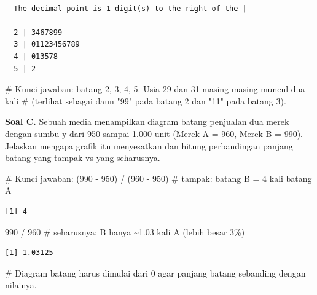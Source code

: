 \documentclass[
  indonesian,
  letterpaper,
]{book}
\newenvironment{Shaded}{\begin{snugshade}}{\end{snugshade}}
\newcommand{\CommentTok}[1]{\textcolor[rgb]{0.37,0.37,0.37}{#1}}
\newcommand{\DecValTok}[1]{\textcolor[rgb]{0.68,0.00,0.00}{#1}}
\newcommand{\NormalTok}[1]{\textcolor[rgb]{0.00,0.23,0.31}{#1}}
\newcommand{\SpecialCharTok}[1]{\textcolor[rgb]{0.37,0.37,0.37}{#1}}
\begin{document}
\begin{verbatim}

  The decimal point is 1 digit(s) to the right of the |

  2 | 3467899
  3 | 01123456789
  4 | 013578
  5 | 2
\end{verbatim}

\begin{Shaded}
\begin{Highlighting}[]
\CommentTok{\# Kunci jawaban: batang 2, 3, 4, 5. Usia 29 dan 31 masing{-}masing muncul dua kali}
\CommentTok{\# (terlihat sebagai daun "99" pada batang 2 dan "11" pada batang 3).}
\end{Highlighting}
\end{Shaded}

\textbf{Soal C.} Sebuah media menampilkan diagram batang penjualan dua
merek dengan sumbu-y dari 950 sampai 1.000 unit (Merek A = 960, Merek B
= 990). Jelaskan mengapa grafik itu menyesatkan dan hitung perbandingan
panjang batang yang tampak vs yang seharusnya.

\begin{Shaded}
\begin{Highlighting}[]
\CommentTok{\# Kunci jawaban:}
\NormalTok{(}\DecValTok{990} \SpecialCharTok{{-}} \DecValTok{950}\NormalTok{) }\SpecialCharTok{/}\NormalTok{ (}\DecValTok{960} \SpecialCharTok{{-}} \DecValTok{950}\NormalTok{) }\CommentTok{\# tampak: batang B = 4 kali batang A}
\end{Highlighting}
\end{Shaded}

\begin{verbatim}
[1] 4
\end{verbatim}

\begin{Shaded}
\begin{Highlighting}[]
\DecValTok{990} \SpecialCharTok{/} \DecValTok{960} \CommentTok{\# seharusnya: B hanya \textasciitilde{}1.03 kali A (lebih besar 3\%)}
\end{Highlighting}
\end{Shaded}

\begin{verbatim}
[1] 1.03125
\end{verbatim}

\begin{Shaded}
\begin{Highlighting}[]
\CommentTok{\# Diagram batang harus dimulai dari 0 agar panjang batang sebanding dengan nilainya.}
\end{Highlighting}
\end{Shaded}
\end{document}
